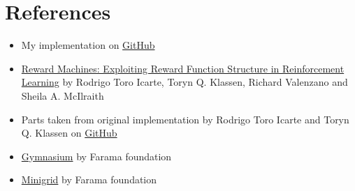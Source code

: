 \documentclass[12pt, a4paper]{article}
\begin{document}
\section*{References}

\begin{itemize}
	\item My implementation on \href{https://github.com/maxstollmayer/Reward-Machines}{GitHub}
	\item \href{https://jair.org/index.php/jair/article/view/12440}{Reward Machines: Exploiting Reward Function Structure in Reinforcement Learning} by Rodrigo Toro Icarte, Toryn Q. Klassen, Richard Valenzano and Sheila A. McIlraith
	\item Parts taken from original implementation by Rodrigo Toro Icarte and Toryn Q. Klassen on \href{https://github.com/RodrigoToroIcarte/reward_machines}{GitHub}
	\item \href{https://gymnasium.farama.org/}{Gymnasium} by Farama foundation
	\item \href{https://minigrid.farama.org/environments/minigrid/DoorKeyEnv/}{Minigrid} by Farama foundation
\end{itemize}
\end{document}
